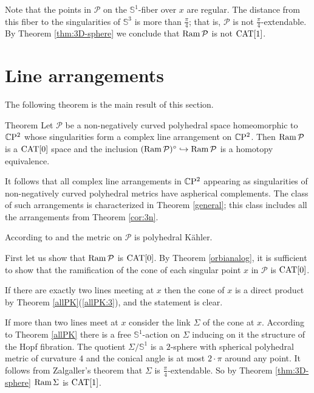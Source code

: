\documentclass[oneside,a4paper]{article}
\begin{document}
Note that the points in $\mathcal{P}$ 
on the $\mathbb{S}^1$-fiber over $x$ are regular.
The distance from this fiber to the singularities of
$\mathbb{S}^3$ is more than $\frac{\pi}{4}$;
that is, $\mathcal{P}$ is not $\frac{\pi}{4}$-extendable.
By Theorem \ref{thm:3D-sphere} we conclude that $\mathop{\rm Ram}\nolimits \mathcal{P}$ is not $\mathrm{CAT}[1]$.
\qeds



\section{Line arrangements}\label{sec:linearrangement}

The following theorem is the main result of this section.

\begin{thm}{Theorem}\label{linearrangement} Let $\mathcal{P}$ be a non-negatively curved polyhedral space homeomorphic to $\mathbb{C}\mathrm{P}^2$ whose singularities form a complex line arrangement on $\mathbb{C}\mathrm{P}^2$.
Then $\mathop{\rm Ram}\nolimits \mathcal{P}$ is a $\mathrm{CAT}[0]$ space and the inclusion $(\mathop{\rm Ram}\nolimits \mathcal{P})^\circ\hookrightarrow\mathop{\rm Ram}\nolimits \mathcal{P}$ is a homotopy equivalence.
\end{thm}

It follows that all complex line arrangements in $\mathbb{C}\mathrm{P}^2$
appearing as singularities of non-negatively curved polyhedral metrics
have aspherical complements. The class of such arrangements is characterized in
Theorem \ref{general};
this class includes all the arrangements from Theorem \ref{cor:3n}.

According to \cite{cheeger}
and \cite{panov}
the metric on $\mathcal{P}$ is
polyhedral K\"ahler.

First let us show that $\mathop{\rm Ram}\nolimits \mathcal P$ is $\mathrm{CAT}[0]$.
By Theorem \ref{orbianalog},
it is sufficient to show that the ramification of the cone of each singular point $x$ in $\mathcal P$ is $\mathrm{CAT}[0]$.

If there are exactly two lines meeting at $x$ then the cone of $x$ is a direct product by Theorem \ref{allPK}(\ref{allPK:3}),
and the statement is clear.

If  more than two lines meet at $x$ consider the link $\Sigma$
of the cone at $x$. According to Theorem \ref{allPK} there is a free $\mathbb{S}^1$-action on $\Sigma$
inducing on it the structure of the Hopf fibration.
The quotient $\Sigma/\mathbb{S}^1$ is a $2$-sphere
with spherical polyhedral metric of curvature $4$
and the conical angle is at most $2\cdot\pi$
around any point.
It follows from Zalgaller's theorem
that $\Sigma$ is $\frac{\pi}{4}$-extendable. So by Theorem \ref{thm:3D-sphere}
$\mathop{\rm Ram}\nolimits \Sigma$ is $\mathrm{CAT}[1]$.
\end{document}
